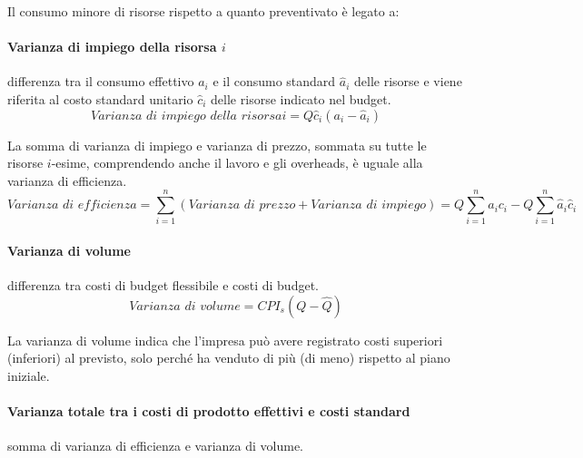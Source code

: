 Il consumo minore di risorse rispetto a quanto preventivato è legato a:

\paragraph{Varianza di impiego della risorsa $i$} differenza tra il consumo effettivo $a_i$ e il consumo standard $\hat{a}_i$ delle risorse e viene riferita al costo standard unitario $\hat{c}_i$ delle
risorse indicato nel budget.
\[
	\textit{Varianza di impiego della risorsa} i = Q \hat{c}_i \left(a_i - \hat{a}_i\right)
\]

La somma di varianza di impiego e varianza di prezzo, sommata su tutte le risorse $i$-esime, comprendendo anche il lavoro e gli overheads, è uguale alla varianza di efficienza.
\[
	\textit{Varianza di efficienza} = \sum^n_{i=1} \left(\textit{Varianza di prezzo} + \textit{Varianza di impiego}\right) = Q \sum^n_{i=1} a_i c_i - Q \sum^n_{i=1} \hat{a}_i \hat{c}_i
\]

\paragraph{Varianza di volume} differenza tra costi di budget flessibile e costi di budget.
\[
	\textit{Varianza di volume} = CPI_s \left(Q - \hat{Q}\right)
\]

La varianza di volume indica che l’impresa può avere registrato costi superiori (inferiori) al
previsto, solo perché ha venduto di più (di meno) rispetto al piano iniziale.

\paragraph{Varianza totale tra i costi di prodotto effettivi e costi standard} somma di varianza di efficienza e varianza di volume.